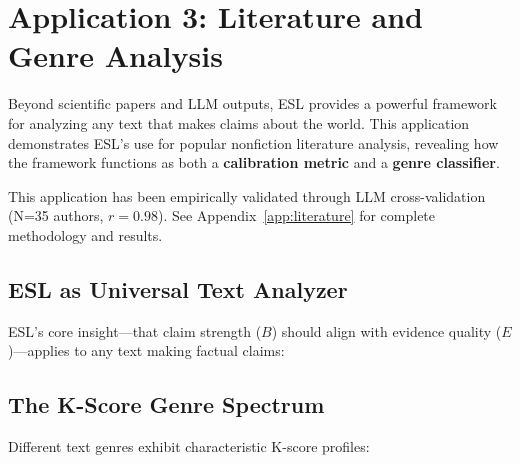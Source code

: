 \documentclass[11pt,a4paper]{article}
\begin{document}
\section{Application 3: Literature and Genre Analysis}
\label{sec:application-literature}

Beyond scientific papers and LLM outputs, ESL provides a powerful framework for analyzing any text that makes claims about the world. This application demonstrates ESL's use for popular nonfiction literature analysis, revealing how the framework functions as both a \textbf{calibration metric} and a \textbf{genre classifier}.

This application has been empirically validated through LLM cross-validation (N=35 authors, $r=0.98$). See Appendix~\ref{app:literature} for complete methodology and results.

\subsection{ESL as Universal Text Analyzer}

ESL's core insight---that claim strength ($B$) should align with evidence quality ($E$)---applies to any text making factual claims:

\begin{center}
\end{center}

\subsection{The K-Score Genre Spectrum}

Different text genres exhibit characteristic K-score profiles:
\end{document}
